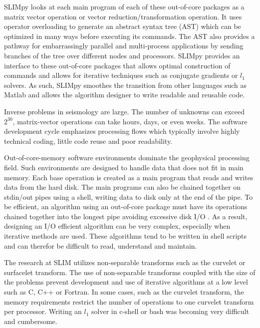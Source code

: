\documentclass{manual}
\begin{document}
SLIMpy looks at each main program of each of these out-of-core packages as a matrix vector
operation or vector reduction/transformation operation. It uses operator
overloading to generate an abstract syntax tree (AST) which can be optimized in
many ways before executing its commands. The AST also provides a pathway for
embarrassingly parallel and multi-process applications by sending branches of 
the tree over different nodes and processors. 
SLIMpy provides an interface to these out-of-core packages that allows optimal
construction of commands and allows for iterative techniques such as conjugate gradients or
$l_{1}$ solvers.
As such, SLIMpy smoothes the
transition from other languages such as Matlab and allows the algorithm designer
to write readable and reusable code. 

Inverse problems in seismology are large. The number of
unknowns can  exceed $2^{30}$, matrix-vector operations can take hours, days, or
even weeks. The software development cycle emphasizes processing flows which
typically involve highly technical coding, little code reuse and poor readability. 

Out-of-core-memory software
environments dominate the  geophysical processing field.
Such environments are designed to handle data that does not fit in main memory. Each base
operation is created as a main program that reads  and writes data from the hard disk. 
The main programs can also be chained together on stdin/out pipes
using a shell, writing data to disk only at the end of the pipe. 
To be efficient, an algorithm using an out-of-core package
 must have its operations chained together into the
longest pipe avoiding excessive disk I/O .
As a result, designing an I/O efficient algorithm can be very complex, especially 
when iterative methods are used. 
These algorithms
tend to be written in shell scripts and can therefor be difficult to read, understand and maintain.  

The research at SLIM utilizes non-separable transforms such
 as the curvelet %
  or surfacelet %
  transform. 
 The use of non-separable transforms coupled with the size of the problems 
 prevent development and use of iterative algorithms at a low level such
as C, C++ or Fortran. In some cases, such as the curvelet transform, the memory requirements
restrict the number of operations to one curvelet transform per processor. Writing
an $l_{1}$ solver in c-shell or bash was becoming very difficult and cumbersome.
\end{document}
